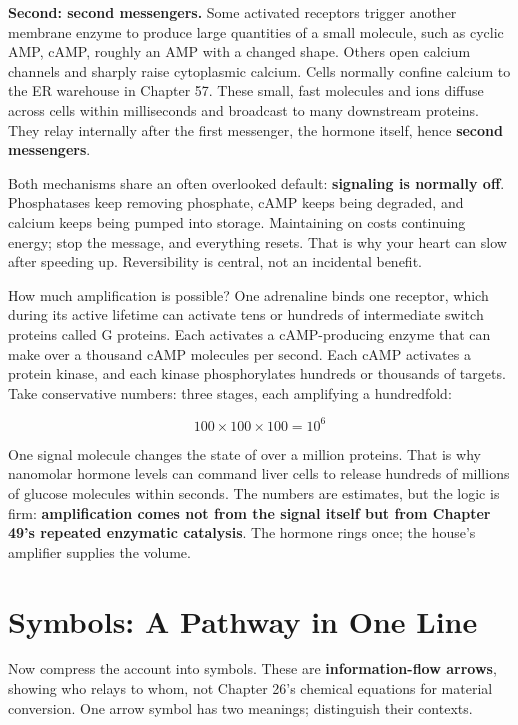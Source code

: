 \textbf{Second: second messengers.} Some activated receptors trigger another membrane enzyme to produce large quantities of a small molecule, such as cyclic AMP, cAMP, roughly an AMP with a changed shape. Others open calcium channels and sharply raise cytoplasmic calcium. Cells normally confine calcium to the ER warehouse in Chapter 57. These small, fast molecules and ions diffuse across cells within milliseconds and broadcast to many downstream proteins. They relay internally after the first messenger, the hormone itself, hence \textbf{second messengers}.

Both mechanisms share an often overlooked default: \textbf{signaling is normally off}. Phosphatases keep removing phosphate, cAMP keeps being degraded, and calcium keeps being pumped into storage. Maintaining on costs continuing energy; stop the message, and everything resets. That is why your heart can slow after speeding up. Reversibility is central, not an incidental benefit.

\begin{qiaoliang}
How much amplification is possible? One adrenaline binds one receptor, which during its active lifetime can activate tens or hundreds of intermediate switch proteins called G proteins. Each activates a cAMP-producing enzyme that can make over a thousand cAMP molecules per second. Each cAMP activates a protein kinase, and each kinase phosphorylates hundreds or thousands of targets. Take conservative numbers: three stages, each amplifying a hundredfold:

\[100\times100\times100 = 10^{6}\]

One signal molecule changes the state of over a million proteins. That is why nanomolar hormone levels can command liver cells to release hundreds of millions of glucose molecules within seconds. The numbers are estimates, but the logic is firm: \textbf{amplification comes not from the signal itself but from Chapter 49's repeated enzymatic catalysis}. The hormone rings once; the house's amplifier supplies the volume.
\end{qiaoliang}

\section{Symbols: A Pathway in One Line}

Now compress the account into symbols. These are \textbf{information-flow arrows}, showing who relays to whom, not Chapter 26's chemical equations for material conversion. One arrow symbol has two meanings; distinguish their contexts.

